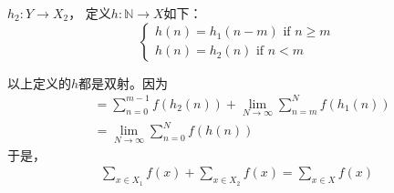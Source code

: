 \documentclass{article}
\begin{document}
\begin{itemize}
        $h_2: Y \rightarrow X_2$，
        定义$h: \mathbb{N} \rightarrow X$如下：
        \begin{equation}
          \begin{cases*}
            h(n) = h_1(n-m) \text{  if  } n \geq m \\
            h(n) = h_2(n) \text{  if  } n < m
          \end{cases*}
        \end{equation}

        以上定义的$h$都是双射。因为
        \begin{align*}
           & = \sum \limits_{n=0}^{m-1} f(h_2(n)) + \lim \limits_{N \rightarrow \infty} \sum \limits_{n=m}^N f(h_1(n)) \\
           & = \lim \limits_{N \rightarrow \infty} \sum \limits_{n=0}^N  f(h(n))
        \end{align*}
        于是，
        \begin{align*}
          \sum \limits_{x \in X_1} f(x) + \sum \limits_{x \in X_2} f(x) = \sum \limits_{x \in X} f(x)
        \end{align*}

\end{itemize}
\end{document}
